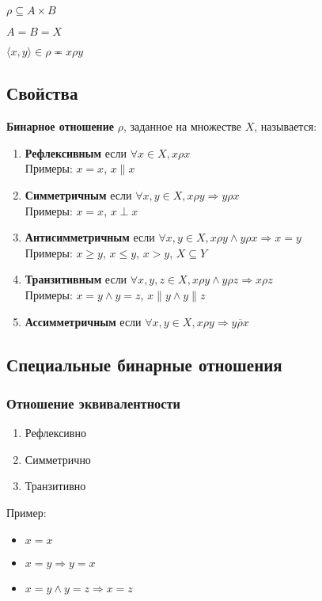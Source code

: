\documentclass{article}
\begin{document}
$\rho \subseteq A \times B$

$A = B = X$

$\langle x, y \rangle \in \rho \eqcirc x \rho y$

\subsection{Свойства}

\textbf{Бинарное отношение} $\rho$, заданное на множестве $X$, называется:
\begin{enumerate}
	\item \textbf{Рефлексивным} если $\forall x \in X, x \rho x$\\
	Примеры: $x = x$, $x \parallel x$
	\item \textbf{Симметричным} если $\forall x, y \in X, x \rho y \Rightarrow y \rho x$\\
	Примеры: $x = x$, $x \perp x$
	\item \textbf{Антисимметричным} если $\forall x, y \in X, x \rho y \land y \rho x \Rightarrow x = y$\\
	Примеры: $x \ge y$, $x \le y$, $x > y$, $X \subseteq Y$
	\item \textbf{Транзитивным} если $\forall x, y, z \in X, x \rho y \land y \rho z \Rightarrow x \rho z$\\
	Примеры: $x = y \land y = z$, $x \parallel y \land y \parallel z$
	\item \textbf{Ассимметричным} если $\forall x, y \in X, x \rho y \Rightarrow \overline{y \rho x}$
\end{enumerate}

\subsection{Специальные бинарные отношения}

\subsubsection{Отношение эквивалентности}

\begin{enumerate}
	\item Рефлексивно
	\item Симметрично
	\item Транзитивно
\end{enumerate}

Пример:

\begin{itemize}
	\item $x = x$
	\item $x = y \Rightarrow y = x$
	\item $x = y \land y = z \Rightarrow x = z$
\end{itemize}
\end{document}
